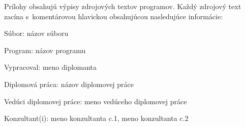 \documentclass[a4paper]{feidipsp}
\begin{document}
Prílohy obsahujú výpisy zdrojových textov programov. Každý zdrojový text zacína s~komentárovou hlavickou obsahujúcou nasledujúce informácie:

Súbor: názov súboru

Program: názov programu

Vypracoval:  meno diplomanta

Diplomová práca: názov diplomovej práce

Vedúci diplomovej práce: meno vedúceho diplomovej práce

Konzultant(i): meno konzultanta c.1, meno konzultanta c.2

\listoffigures

\listoftables
\end{document}
